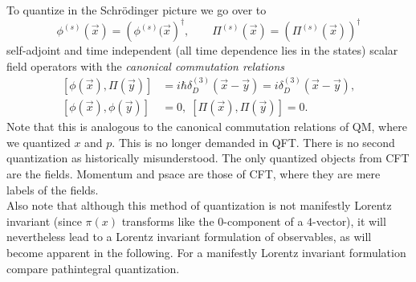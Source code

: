 To quantize in the Schrödinger picture we go over to
\begin{equation}
	\phi^{(s)} (\vec{x}) = \left(\phi^{(s)}(\vec{x}\right)^{\dagger}, \qquad \Pi^{(s)}(\vec{x})=\left(\Pi^{(s)} (\vec{x})\right)^{\dagger}
\end{equation}
self-adjoint and time independent (all time dependence lies in the states) scalar field operators with the \emph{canonical commutation relations}
\begin{align}
	\left[\phi(\vec{x}),\Pi(\vec{y}) \right] &= i \hbar \delta^{(3)}_D (\vec{x}-\vec{y})= i \delta^{(3)}_D (\vec{x}-\vec{y}),\\
	 \left[\phi(\vec{x}), \phi(\vec{y})\right]&=0, \; \left[\Pi(\vec{x}), \Pi(\vec{y})\right]=0.
\end{align}
Note that this is analogous to the canonical commutation relations of QM, where we quantized $x$ and $p$. This is no longer demanded in QFT. There is no second quantization as historically misunderstood. The only quantized objects from CFT are the fields. Momentum and psace are those of CFT, where they are mere labels of the fields.\\
Also note that although this method of quantization is not manifestly Lorentz invariant (since $\pi(x)$ transforms like the $0$-component of a $4$-vector), it will nevertheless lead to a Lorentz invariant formulation of observables, as will become apparent in the following. For a manifestly Lorentz invariant formulation compare pathintegral quantization.
